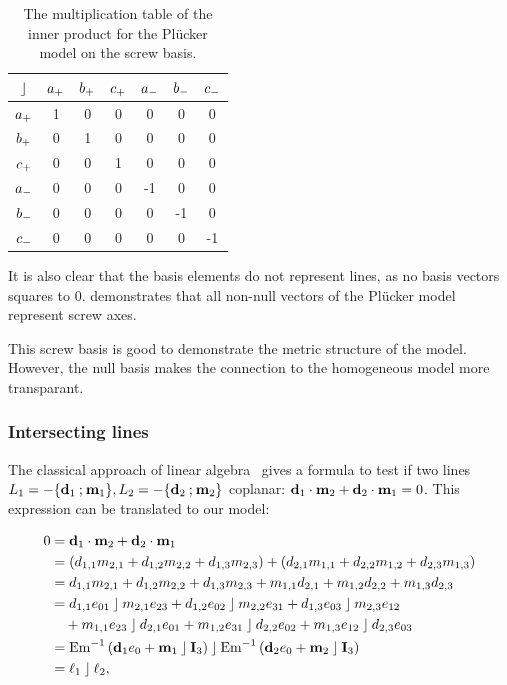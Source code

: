 \begin{table}
  \caption{The multiplication table of the inner product for the Pl\"ucker model on the screw basis.}
  \label{tab:screwmetric}
  \begin{center}
    \begin{tabular}{|c||c|c|c|c|c|c|}
      \hline
      $\mathbin{\rfloor}$ & $a_{+}$ & $b_{+}$ & $c_{+}$ & $a_{-}$ & $b_{-}$ & $c_{-}$ \\
      \hline \hline
      $a_{+}$ & 1 & 0 & 0 & 0 & 0 & 0 \\
      \hline
      $b_{+}$ & 0 & 1 & 0 & 0 & 0 & 0 \\
      \hline
      $c_{+}$ & 0 & 0 & 1 & 0 & 0 & 0 \\
      \hline
      $a_{-}$ & 0 & 0 & 0 & -1 & 0 & 0 \\
      \hline
      $b_{-}$ & 0 & 0 & 0 & 0 & -1 & 0 \\
      \hline
      $c_{-}$ & 0 & 0 & 0 & 0 & 0 & -1 \\
      \hline
    \end{tabular}
  \end{center}
\end{table}

It is also clear that the basis elements do not represent lines, as no basis vectors squares to $0$.   demonstrates that all non-null vectors of the Pl\"ucker model represent screw axes.  

This screw basis is good to demonstrate the metric structure of the model.  However, the null basis makes the connection to the homogeneous model more transparant.  

\subsubsection{Intersecting lines}
The classical approach of linear algebra~\cite{Shoemake} gives a formula to test if two lines $L_1 = -\{\mathbf{d}_1 \mathbin{;} \mathbf{m}_1\}, L_2 = -\{\mathbf{d}_2 \mathbin{;} \mathbf{m}_2\}$ coplanar: $\mathbf{d}_1 \mathbin{\cdot} \mathbf{m}_2 + \mathbf{d}_2 \mathbin{\cdot} \mathbf{m}_1 = 0$.  This expression can be translated to our model:

\begin{align*}
  0 &= \mathbf{d}_1 \mathbin{\cdot} \mathbf{m}_2 + \mathbf{d}_2 \mathbin{\cdot} \mathbf{m}_1 \\
    &= \left( d_{1,1} m_{2,1} + d_{1,2} m_{2,2} + d_{1,3} m_{2,3} \right) + \left( d_{2,1} m_{1,1} + d_{2,2} m_{1,2} + d_{2,3} m_{1,3} \right) \\
    &= d_{1,1} m_{2,1} + d_{1,2} m_{2,2} + d_{1,3} m_{2,3} + m_{1,1} d_{2,1} + m_{1,2} d_{2,2} + m_{1,3} d_{2,3} \\
    &= d_{1,1} e_{01} \mathbin{\rfloor} m_{2,1} e_{23} + d_{1,2} e_{02} \mathbin{\rfloor} m_{2,2} e_{31} + d_{1,3} e_{03} \mathbin{\rfloor} m_{2,3} e_{12} \\
    &\quad + m_{1,1} e_{23} \mathbin{\rfloor} d_{2,1} e_{01} + m_{1,2} e_{31} \mathbin{\rfloor} d_{2,2} e_{02} + m_{1,3} e_{12} \mathbin{\rfloor} d_{2,3} e_{03} \\
    &= \operatorname{Em}^{-1}\left( \mathbf{d}_1e_0 + \mathbf{m}_1 \mathbin{\rfloor} \mathbf{I}_3 \right) \mathbin{\rfloor} \operatorname{Em}^{-1}\left( \mathbf{d}_2e_0 + \mathbf{m}_2 \mathbin{\rfloor} \mathbf{I}_3 \right) \\
    &= \ell_1 \mathbin{\rfloor} \ell_2,
\end{align*}

